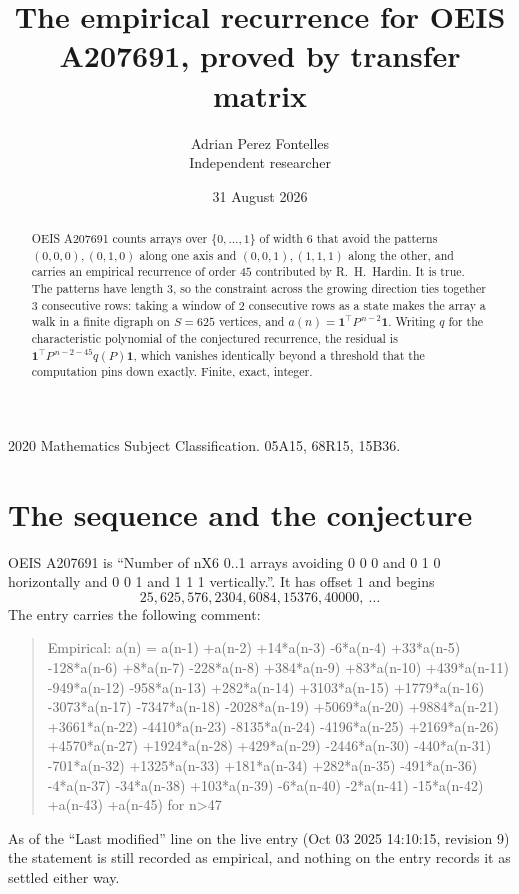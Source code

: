 \documentclass[11pt,a4paper]{article}
\title{The empirical recurrence for OEIS A207691, proved by transfer matrix}
\author{Adrian Perez Fontelles\\ \small Independent researcher}
\date{31 August 2026}
\theoremstyle{plain}
\theoremstyle{definition}
\begin{document}
\maketitle

\begin{abstract}
OEIS A207691 counts arrays over $\{0,\dots,1\}$ of width $6$ that avoid the patterns
$(0,0,0), (0,1,0)$ along one axis and $(0,0,1), (1,1,1)$ along the other, and carries an empirical recurrence of
order $45$ contributed by R.~H.~Hardin. It is true. The patterns have length $3$, so
the constraint across the growing direction ties together $3$ consecutive rows: taking a
window of $2$ consecutive rows as a state makes the array a walk in a finite digraph
on $S=625$ vertices, and $a(n)=\mathbf{1}^{\!\top}P^{\,n-2}\mathbf{1}$. Writing $q$
for the characteristic polynomial of the conjectured recurrence, the residual is
$\mathbf{1}^{\!\top}P^{\,n-2-45}q(P)\mathbf{1}$, which vanishes identically
beyond a threshold that the computation pins down exactly. Finite, exact, integer.
\end{abstract}

\noindent\small 2020 Mathematics Subject Classification. 05A15, 68R15, 15B36.\normalsize

\section{The sequence and the conjecture}

OEIS A207691 is ``Number of nX6 0..1 arrays avoiding 0 0 0 and 0 1 0 horizontally and 0 0 1 and 1 1 1 vertically.''. It has offset
$1$ and begins
\[
25, 625, 576, 2304, 6084, 15376, 40000,\ \dots
\]
The entry carries the following comment:
\begin{quote}\small
Empirical: a(n) = a(n-1) +a(n-2) +14*a(n-3) -6*a(n-4) +33*a(n-5) -128*a(n-6) +8*a(n-7) -228*a(n-8) +384*a(n-9) +83*a(n-10) +439*a(n-11) -949*a(n-12) -958*a(n-13) +282*a(n-14) +3103*a(n-15) +1779*a(n-16) -3073*a(n-17) -7347*a(n-18) -2028*a(n-19) +5069*a(n-20) +9884*a(n-21) +3661*a(n-22) -4410*a(n-23) -8135*a(n-24) -4196*a(n-25) +2169*a(n-26) +4570*a(n-27) +1924*a(n-28) +429*a(n-29) -2446*a(n-30) -440*a(n-31) -701*a(n-32) +1325*a(n-33) +181*a(n-34) +282*a(n-35) -491*a(n-36) -4*a(n-37) -34*a(n-38) +103*a(n-39) -6*a(n-40) -2*a(n-41) -15*a(n-42) +a(n-43) +a(n-45) for n>47
\end{quote}
As of the ``Last modified'' line on the live entry (Oct 03 2025 14:10:15, revision
9) the statement is still recorded as empirical, and nothing on the entry
records it as settled either way.
\end{document}
